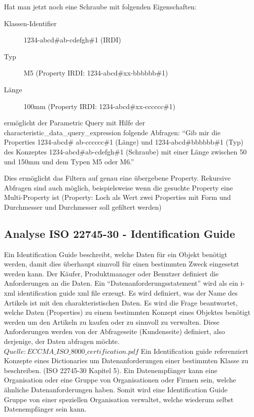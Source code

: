 Hat man jetzt noch eine Schraube mit folgenden Eigenschaften:
\begin{description}
\item[Klassen-Identifier] 1234-abcd\#ab-cdefgh\#1 (IRDI)
\item[Typ] M5 (Property IRDI: 1234-abcd\#xx-bbbbbb\#1)
\item[Länge] 100mm (Property IRDI: 1234-abcd\#xx-cccccc\#1)
\end{description}

ermöglicht der Parametric Query mit Hilfe der characteristic\_data\_query\_expression folgende Abfragen:  \enquote{Gib mir die Properties 1234-abcd\# ab-cccccc\#1 (Länge) und 1234-abcd\#bbbbbb\#1 (Typ) des Konzeptes 1234-abcd\#ab-cdefgh\#1 (Schraube) mit einer Länge zwischen 50 und 150mm und dem Typen M5 oder M6.}

Dies ermöglicht das Filtern auf genau eine übergebene Property. Rekursive Abfragen sind auch möglich, beispielsweise wenn die gesuchte Property eine Multi-Property ist (Property: Loch als Wert zwei Properties mit Form und Durchmesser und Durchmesser soll gefiltert werden)

\subsection{Analyse ISO 22745-30 - Identification Guide}\label{kap:identification_guide}

Ein Identification Guide beschreibt, welche Daten für ein Objekt benötigt werden, damit dies überhaupt sinnvoll für einen bestimmten Zweck eingesetzt werden kann. Der Käufer, Produktmanager oder Benutzer definiert die Anforderungen an die Daten. Ein  \enquote{Datenanforderungsstatement} wird als ein i-xml identification guide xml file erzeugt. Es wird definiert, was der Name des Artikels ist mit den charakteristischen Daten. Es wird die Frage beantwortet, welche Daten (Properties) zu einem bestimmten Konzept eines Objektes benötigt werden um den Artikeln zu kaufen oder zu sinnvoll zu verwalten. Diese Anforderungen werden von der Abfrageseite (Kundenseite) definiert, also derjenige, der Daten abfragen möchte. \(Quelle: ECCMA\_ISO\_8000\_certification.pdf\) 
Ein Identification guide referenziert Konzepte eines Dictionaries um Datenanforderungen einer bestimmten Klasse zu beschreiben. (ISO 22745-30 Kapitel 5). 
Ein Datenempfänger kann eine Organisation oder eine Gruppe von Organisationen oder Firmen sein, welche ähnliche Datenanforderungen haben. Somit wird eine Identification Guide Gruppe von einer speziellen Organisation verwaltet, welche wiederum selbst Datenempfänger sein kann.  

